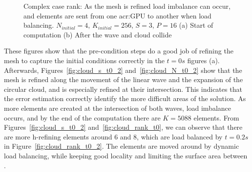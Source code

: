 \begin{figure}[H]
	\centering
	\hfill
	\caption{Complex case rank: As the mesh is refined load imbalance can occur, and elements are sent from one \acrshort{acr:GPU} to another when load balancing. \(N_{initial} = 4\), \(K_{initial} = 256\), \(S = 3\), \(P = 16\) (a) Start of computation (b) After the wave and cloud collide}\label{fig:cloud_rank}
\end{figure}

These figures show that the pre-condition steps do a good job of refining the mesh to capture the
initial conditions correctly in the \(t = 0 s\) figures (a). Afterwards,
Figures~\ref{fig:cloud_s_t0_2} and~\ref{fig:cloud_N_t0_2} show that the mesh is refined along the
movement of the linear wave and the expansion of the circular cloud, and is especially refined at
their intersection. This indicates that the error estimation correctly identify the more difficult
areas of the solution. As more elements are created at the intersection of both waves, load
imbalance occurs, and by the end of the computation there are \(K = 5088\) elements. From
Figures~\ref{fig:cloud_s_t0_2} and~\ref{fig:cloud_rank_t0}, we can observe that there are more
h-refining elements around  \(6\) and \(8\), which are load balanced by \(t =
0.2 s\) in Figure~\ref{fig:cloud_rank_t0_2}. The elements are moved around by dynamic load
balancing, while keeping good locality and limiting the surface area between .

